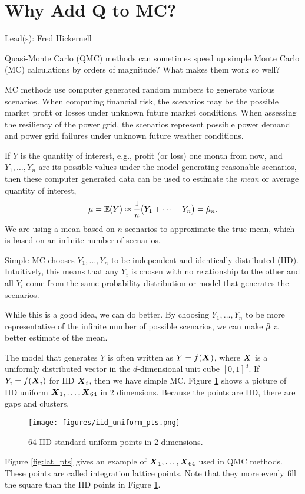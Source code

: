 \documentclass{article}
\newcommand{\blogpost}[3]{\newpage%
\section{#1}%
\begin{refsection}%
	Lead(s): #2 \bigskip #3%
\printbibliography[heading=subbibliography]
\end{refsection}
} %
\begin{document}
\blogpost{Why Add Q to MC?}{Fred Hickernell}{\label{WhyQ}

Quasi-Monte Carlo (QMC) methods can sometimes speed up simple Monte Carlo (MC) calculations by orders of magnitude?  What makes them work so well?

MC methods use computer generated random numbers to generate various scenarios.  When computing financial risk, the scenarios may be the possible market profit or losses under unknown future market conditions.  When assessing the resiliency of the power grid, the scenarios represent possible power demand and power grid failures under unknown future weather conditions.

If $Y$ is the quantity of interest, e.g., profit (or loss) one month from now, and $Y_1, \ldots, Y_n$ are its possible values under the model generating reasonable scenarios, then these computer generated data can be used to estimate the \emph{mean} or average quantity of interest, 
\[
\mu = \operatorname{\mathbb{E}}(Y) \approx \frac 1n \bigl ( Y_1 + \cdots + Y_n \bigr) = \hat{\mu}_n.
\]
We are using a mean based on $n$ scenarios to approximate the true mean, which is based on an infinite number of scenarios.

Simple MC chooses $Y_1, \ldots, Y_n$ to be independent and identically distributed (IID).  Intuitively, this means that any $Y_i$ is chosen with no relationship to the other and all $Y_i$ come from the same probability distribution or model that generates the scenarios.

While this is a good idea, we can do better.  By choosing $Y_1, \ldots, Y_n$ to be more representative of the infinite number of possible scenarios, we can make $\hat{\mu}$ a better estimate of the mean.

The model that generates $Y$ is often written as $Y= f(\boldsymbol{X})$, where $\boldsymbol{X}$ is a uniformly distributed vector in the $d$-dimensional unit cube $[0,1]^d$.  If $Y_i = f(\boldsymbol{X}_i)$ for IID $\boldsymbol{X}_i$, then we have simple MC.  Figure \ref{fig:iid_pts} shows a picture of IID uniform  $\boldsymbol{X}_1, \ldots, \boldsymbol{X}_{64}$ in $2$ dimensions.  Because the points are IID, there are gaps and clusters.

\begin{figure}[ht!]
    \centering
    \texttt{[image: figures/iid\_uniform\_pts.png]}
    \caption{64 IID standard uniform points in 2 dimensions.}
    \label{fig:iid_pts}
\end{figure}

Figure \ref{fig:lat_pts} gives an example of $\boldsymbol{X}_1, \ldots, \boldsymbol{X}_{64}$ used in QMC methods.  These points are called integration lattice points.  Note that they more evenly fill the square than the IID points in Figure \ref{}.

}
\end{document}

